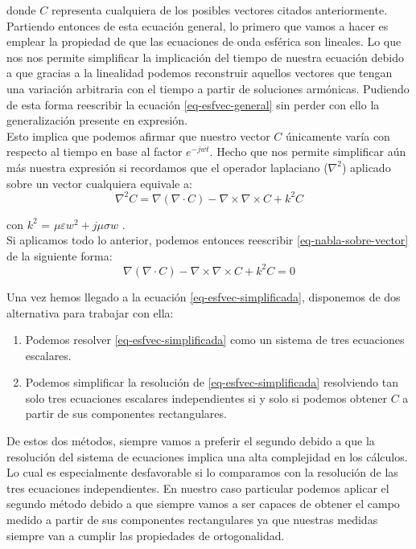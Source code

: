 \noindent
donde $C$ representa cualquiera de los posibles vectores citados anteriormente.\\

Partiendo entonces de esta ecuación general, lo primero que vamos a hacer es emplear la propiedad de que las ecuaciones de onda esférica son lineales. Lo que nos nos permite simplificar la implicación del tiempo de nuestra ecuación debido a que gracias a la linealidad podemos reconstruir aquellos vectores que tengan una variación arbitraria con el tiempo a partir de soluciones armónicas. Pudiendo de esta forma reescribir la ecuación \eqref{eq-esfvec-general} sin perder con ello la generalización presente en expresión. \\

Esto implica que podemos afirmar que nuestro vector $C$ únicamente varía con respecto al tiempo en base al factor $e^{-jwt}$. Hecho que nos permite simplificar aún más nuestra expresión si recordamos que el operador laplaciano ($\nabla^2$) aplicado sobre un vector cualquiera equivale a:
\begin{equation}
\nabla^2C =\nabla(\nabla \cdot C) - \nabla\times\nabla\times C + k^2C
\label{eq-nabla-sobre-vector}
\end{equation}

\noindent
con $k^2$ = $\mu\varepsilon w^2 + j\mu\sigma w$ .\\

\noindent
Si aplicamos todo lo anterior, podemos entonces reescribir  \eqref{eq-nabla-sobre-vector} de la siguiente forma:
\begin{equation}
\nabla(\nabla \cdot C) - \nabla \times \nabla \times C + k^2 C = 0
\label{eq-esfvec-simplificada}
\end{equation}

\noindent
Una vez hemos llegado a la ecuación \eqref{eq-esfvec-simplificada}, disponemos de dos alternativa para trabajar con ella: 

\begin{enumerate}
    \item Podemos resolver \eqref{eq-esfvec-simplificada} como un sistema de tres ecuaciones escalares.
    \item Podemos simplificar la resolución de \eqref{eq-esfvec-simplificada} resolviendo tan solo tres ecuaciones escalares independientes si y solo si podemos obtener $C$ a partir de sus componentes rectangulares.
\end{enumerate}

De estos dos métodos, siempre vamos a preferir el segundo debido a que la resolución del sistema de ecuaciones implica una alta complejidad en los cálculos. Lo cual es especialmente desfavorable si lo comparamos con la resolución de las tres ecuaciones independientes. En nuestro caso particular podemos aplicar el segundo método debido a que siempre vamos a ser capaces de obtener el campo medido a partir de sus componentes rectangulares ya que nuestras medidas siempre van a cumplir las propiedades de ortogonalidad.
\\

